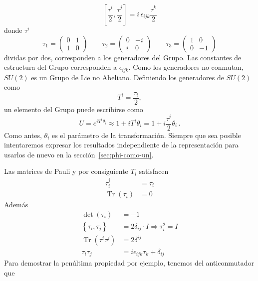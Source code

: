 \begin{equation}
  \label{eq:62}
  \left[\frac{\tau^i}{2},\frac{\tau^j}{2} \right]=i\,\epsilon_{ijk}\frac{\tau^k}{2}
\end{equation}
donde $\tau^i$ 
\begin{equation}
  \label{eq:66}
  \tau_1=
  \begin{pmatrix}
    0&1\\
    1&0
  \end{pmatrix} \qquad
 \tau_2=
  \begin{pmatrix}
    0&-i\\
    i&0
  \end{pmatrix}\qquad 
 \tau_3=
  \begin{pmatrix}
    1&0\\
    0&-1
  \end{pmatrix}
 \end{equation}
dividas por dos, corresponden a los generadores del Grupo. Las constantes de estructura del Grupo corresponden a $\epsilon_{ijk}$. Como los generadores no conmutan, $SU(2)$ es un Grupo de Lie no Abeliano. Definiendo los generadores de $SU(2)$ como
\begin{equation}
  T^i=\frac{\tau_i}{2},
\end{equation}
un elemento del Grupo puede escribirse como
\begin{equation}
  \label{eq:63}
  U=e^{iT^i \theta_i }\approx1+iT^i\theta_i=1+i\frac{\tau^i}{2}\theta_i\,.
\end{equation}
Como antes, $\theta_i$ es el par\'ametro de la transformaci\'on. Siempre que sea posible intentaremos expresar los resultados independiente de la representaci\'on para usarlos de nuevo en la secci\'on~\ref{sec:phi-como-un}.

Las matrices de Pauli y por consiguiente $T_i$ satisfacen 
\begin{align}
  \tau_i^\dagger&=\tau_i\nonumber\\
  \operatorname{Tr}  \left(
    \tau_i
  \right)&=0
\end{align}
Adem\'as
\begin{align}
  \label{eq:64}
  \det
  \left(
    \tau_i
  \right)&=-1\nonumber\\
  \left\{ 
    \tau_i,\tau_j
  \right\}&=2\delta_{ij}\cdot I\Rightarrow\tau_i^2=I\nonumber \\
\operatorname{Tr} \left(\tau^i\tau^j\right)&=2\delta^{ij}\nonumber\\
\tau_i\tau_j&=i\epsilon_{ijk}\tau_k+\delta_{ij}
\end{align}
Para demostrar la pen\'ultima propiedad por ejemplo, tenemos del anticonmutador que

